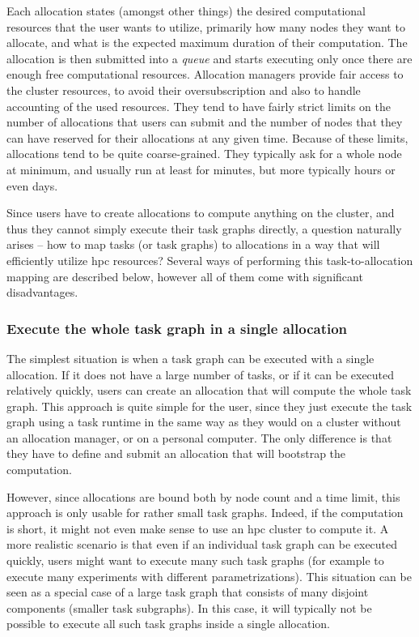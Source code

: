 Each allocation states (amongst other things) the desired computational resources that the user
wants to utilize, primarily how many nodes they want to allocate, and what is the expected maximum
duration of their computation. The allocation is then submitted into a \emph{queue}
and starts executing only once there are enough free computational resources. Allocation managers
provide fair access to the cluster resources, to avoid their oversubscription and also to handle
accounting of the used resources. They tend to have fairly strict limits on the number of
allocations that users can submit and the number of nodes that they can have reserved for their
allocations at any given time. Because of these limits, allocations tend to be quite
coarse-grained. They typically ask for a whole node at minimum, and usually run at least for
minutes, but more typically hours or even days.

Since users have to create allocations to compute anything on the cluster, and thus they cannot
simply execute their task graphs directly, a question naturally arises -- how to map tasks (or task
graphs) to allocations in a way that will efficiently utilize \gls{hpc}
resources? Several ways of performing this task-to-allocation mapping are described below, however
all of them come with significant disadvantages.

\subsubsection*{Execute the whole task graph in a single allocation}
The simplest situation is when a task graph can be executed with a single allocation. If it does
not have a large number of tasks, or if it can be executed relatively quickly, users can create an
allocation that will compute the whole task graph. This approach is quite simple for the user,
since they just execute the task graph using a task runtime in the same way as they would on a
cluster without an allocation manager, or on a personal computer. The only difference is that they
have to define and submit an allocation that will bootstrap the computation.

However, since allocations are bound both by node count and a time limit, this approach is only
usable for rather small task graphs. Indeed, if the computation is short, it might not even make
sense to use an \gls{hpc} cluster to compute it. A more realistic scenario is
that even if an individual task graph can be executed quickly, users might want to execute many
such task graphs (for example to execute many experiments with different parametrizations). This
situation can be seen as a special case of a large task graph that consists of many disjoint
components (smaller task subgraphs). In this case, it will typically not be possible to execute all
such task graphs inside a single allocation.

